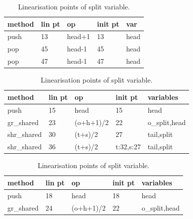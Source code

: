 \documentclass{sig-alternate-br}
\begin{document}
\begin{table}[h]
	\begin{subtable}[h]{0.45\textwidth}
		\centering
		\begin{tabular}{|l|l|l|l|l|}
			\hline
			\textbf{method} & \textbf{lin pt} & \textbf{op} & \textbf{init pt} & \textbf{var} \\ \hline
			push            & 13                 & head+1      & 13                  & head               \\ \hline
			pop             & 45                 & head-1      & 45                  & head               \\ \hline
			pop             & 47                 & head-1      & 47                  & head               \\ \hline
		\end{tabular}
		\caption{Linearisation points of head variable.}
		\label{tab:head}
	\end{subtable}
	\hfill
	\begin{subtable}[h]{0.45\textwidth}
		\centering
		\begin{tabular}{|l|l|l|l|l|}
			\hline
			\textbf{method} & \textbf{lin pt} & \textbf{op} & \textbf{init pt} & \textbf{variables}  \\ \hline
			push            & 15                 & head        & 15                  & head                \\ \hline
			gr\_shared    & 23                 & (o+h+1)/2      & 22                  & o\_split,head \\ \hline
			shr\_shared  & 30                 & (t+s)/2      & 27                  & tail,split             \\ \hline
			shr\_shared  & 36                 & (t+s)/2      & t:32,s:27        & tail,split             \\ \hline
		\end{tabular}
		\caption{Linearisation points of split variable.}
		\label{tab:split}
	\end{subtable}
	\hfill
	\begin{subtable}[h]{0.45\textwidth}
		\centering
		\begin{tabular}{|l|l|l|l|l|}
			\hline
			\textbf{method} & \textbf{lin pt} & \textbf{op} & \textbf{init pt} & \textbf{variables}  \\ \hline
			push            & 18                 & head        & 18                  & head                \\ \hline
			gr\_shared    & 24                 & (o+h+1)/2      & 22                  & o\_split,head \\ \hline

\end{tabular}
\end{subtable}
\end{table}
\end{document}
